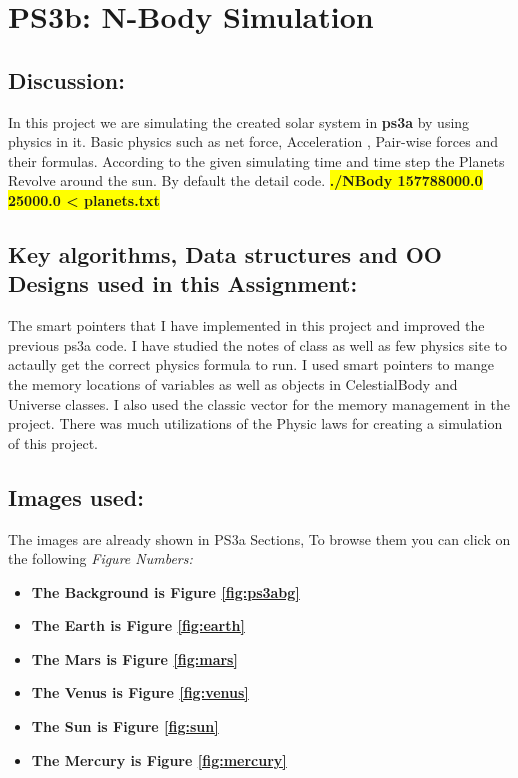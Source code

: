 \section{PS3b: N-Body Simulation}\label{sec:ps3b}
\graphicspath{{ps3b}}
\subsection{Discussion:}\label{sec:ps3b:disc}
    In this project we are simulating the created solar system in \textbf{ps3a} by using physics in it. Basic physics such as net force, Acceleration , Pair-wise forces and their formulas.
    According to the given simulating time and time step the Planets Revolve around the sun.
    \newline By default the detail code. \newline
    \textbf{\colorbox{yellow}{ ./NBody 157788000.0 25000.0 < planets.txt }}

\subsection{Key algorithms, Data structures and OO Designs used in this Assignment:}
      The smart pointers that I have implemented in this project and improved the previous ps3a code.
     I have studied the notes of class as well as few physics site to actaully get the correct physics formula to run.
 I used smart pointers to mange the memory locations of variables as well as objects in CelestialBody and Universe classes. I also used the classic vector for the memory management in the project. There was much utilizations of the Physic laws for creating a simulation of this project.

\subsection{Images used:}
The images are already shown in PS3a Sections, To browse them you can click on the following \textit{Figure Numbers:}
\begin{itemize}
    \item \textbf{The Background is Figure \ref{fig:ps3abg}}
    \item \textbf{The Earth is Figure \ref{fig:earth}}
    \item \textbf{The Mars is Figure \ref{fig:mars}}
    \item \textbf{The Venus is Figure \ref{fig:venus}}
    \item \textbf{The Sun is Figure \ref{fig:sun}}
    \item \textbf{The Mercury is Figure \ref{fig:mercury}}
    
\end{itemize}

